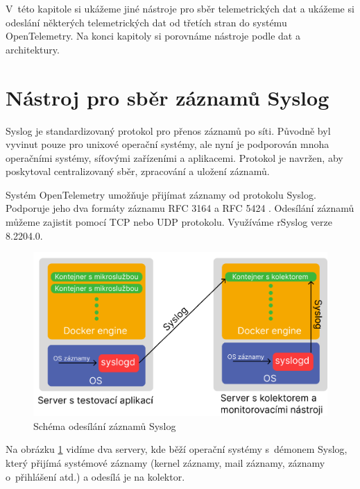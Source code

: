 V~této kapitole si ukážeme jiné nástroje pro sběr telemetrických dat a ukážeme si odeslání některých telemetrických dat od třetích stran do systému OpenTelemetry. Na konci kapitoly si porovnáme nástroje podle dat a architektury.


\section{Nástroj pro sběr záznamů Syslog}
\label{Syslog}

Syslog \cite{RFC3164} je standardizovaný protokol pro přenos záznamů po síti. Původně byl vyvinut pouze pro unixové operační systémy, ale nyní je podporován mnoha operačními systémy, síťovými zařízeními a aplikacemi. Protokol je navržen, aby poskytoval centralizovaný sběr, zpracování a uložení záznamů.


Systém OpenTelemetry umožňuje přijímat záznamy od protokolu Syslog. Podporuje jeho dva formáty záznamu RFC 3164 \cite{RFC3164} a RFC 5424 \cite{RFC5424}. Odesílání záznamů můžeme zajistit pomocí TCP nebo UDP protokolu. Využíváme rSyslog verze 8.2204.0.

\begin{figure}[H]
  \centering
  \includegraphics[width=13cm]{obrazky-figures/Syslog_topology.png}
  \caption{Schéma odesílání záznamů Syslog}
  \label{fig:SyslogTopology}
\end{figure}

Na obrázku \ref{fig:SyslogTopology} vidíme dva servery, kde běží operační systémy s~démonem Syslog, který přijímá systémové záznamy (kernel záznamy, mail záznamy, záznamy o~přihlášení atd.) a odesílá je na kolektor.

